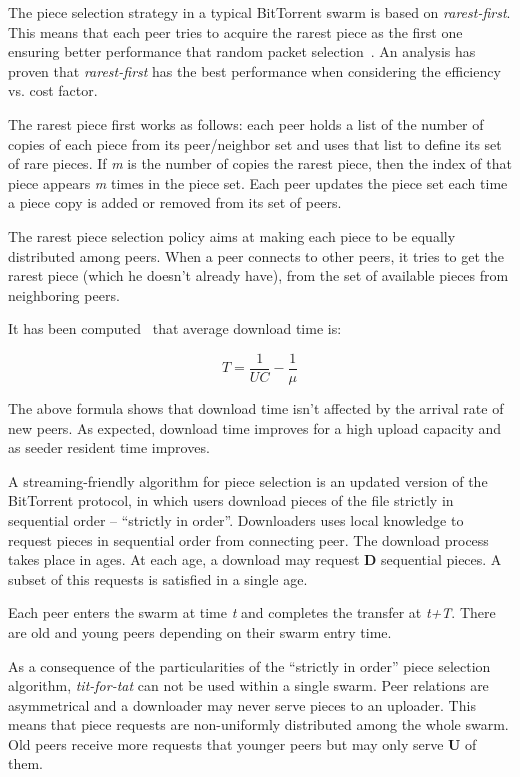 The piece selection strategy in a typical BitTorrent swarm is based on
\textit{rarest-first}. This means that each peer tries to acquire the rarest
piece as the first one ensuring better performance that random packet
selection~\cite{bt-analysis}\cite{scaling-networks}. An analysis has proven that
\textit{rarest-first} has the best performance when considering the efficiency
vs. cost factor.

The rarest piece first works as follows: each peer holds a list of the number
of copies of each piece from its peer/neighbor set and uses that list to
define its set of rare pieces. If \textit{m} is the number of copies the
rarest piece, then the index of that piece appears \textit{m} times in the
piece set. Each peer updates the piece set each time a piece copy is added or
removed from its set of peers.

The rarest piece selection policy aims at making each piece to be equally
distributed among peers. When a peer connects to other peers, it tries to
get the rarest piece (which he doesn't already have), from the set of
available pieces from neighboring peers.

It has been computed~\cite{bt-analysis-on-demand} that average download time is:

\begin{equation}
T = \frac{1}{UC}-\frac{1}{\mu}
\end{equation}

The above formula shows that download time isn't affected by the arrival rate
of new peers. As expected, download time improves for a high upload capacity
and as seeder resident time improves.

A streaming-friendly algorithm for piece selection is an updated version of
the BitTorrent protocol, in which users download pieces of the file strictly
in sequential order -- ``strictly in order''. Downloaders uses local knowledge
to request pieces in sequential order from connecting peer. The download
process takes place in ages. At each age, a download may request \textbf{D}
sequential pieces. A subset of this requests is satisfied in a single age.

Each peer enters the swarm at time \textit{t} and completes the transfer at
\textit{t+T}. There are old and young peers depending on their swarm entry
time.

As a consequence of the particularities of the ``strictly in order'' piece
selection algorithm, \textit{tit-for-tat} can not be used within a single
swarm. Peer relations are asymmetrical and a downloader may never serve
pieces to an uploader. This means that piece requests are non-uniformly
distributed among the whole swarm. Old peers receive more requests that
younger peers but may only serve \textbf{U} of them.

